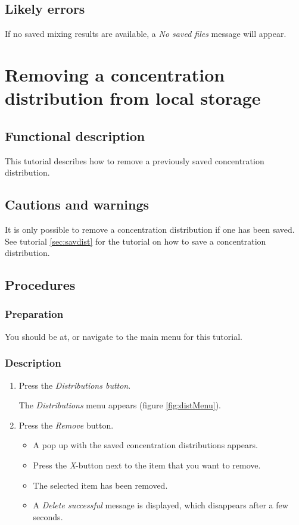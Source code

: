 \subsection{Likely errors}
If no saved mixing results are available, a \emph{No saved files} message will appear.


\section{Removing a concentration distribution from local storage}\label{sec:remdist}

\subsection{Functional description}
This tutorial describes how to remove a previously saved concentration distribution.

\subsection{Cautions and warnings}
It is only possible to remove a concentration distribution if one has been saved. See tutorial \ref{sec:savdist} for the tutorial on how to save a concentration distribution.

\subsection{Procedures}

\subsubsection{Preparation}
You should be at, or navigate to the main menu for this tutorial.

\subsubsection{Description}
\begin{enumerate}
	\item Press the \emph{Distributions button}.
		\begin{itemize}
			The \emph{Distributions} menu appears (figure \ref{fig:distMenu}).
		\end{itemize}
	\item Press the \emph{Remove} button.
		\begin{itemize}
			\item A pop up with the saved concentration distributions appears.
	\item Press the \emph{X}-button next to the item that you want to remove.
			\item The selected item has been removed.
			\item A \emph{Delete successful} message is displayed, which disappears after a few seconds.
		\end{itemize}
\end{enumerate}

